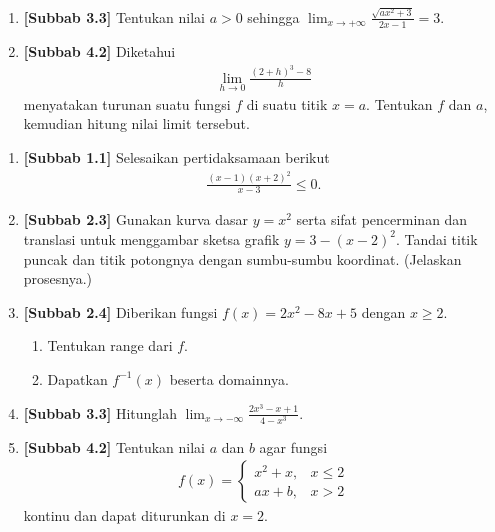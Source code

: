 \documentclass[10pt,openany,a4paper]{article}
\theoremstyle{definition}
\theoremstyle{definition}
\theoremstyle{plain}
\begin{document}
\begin{enumerate}
    \item \textbf{[Subbab 3.3]} Tentukan nilai $a>0$ sehingga $\displaystyle\lim_{x\to+\infty}\frac{\sqrt{ax^2+3}}{2x-1}=3$.

    \item \textbf{[Subbab 4.2]} Diketahui
    \begin{align*}
        \lim_{h\to 0}\frac{(2+h)^3-8}{h}
    \end{align*}
    menyatakan turunan suatu fungsi $f$ di suatu titik $x=a$. Tentukan $f$ dan $a$, kemudian hitung nilai limit tersebut.
\end{enumerate}

\newpage

\begin{enumerate}
    \item \textbf{[Subbab 1.1]} Selesaikan pertidaksamaan berikut
    \begin{align*}
        \frac{(x-1)(x+2)^2}{x-3}\leq 0.
    \end{align*}

    \item \textbf{[Subbab 2.3]} Gunakan kurva dasar $y=x^2$ serta sifat pencerminan dan translasi untuk menggambar sketsa grafik $y=3-(x-2)^2$. Tandai titik puncak dan titik potongnya dengan sumbu-sumbu koordinat. (Jelaskan prosesnya.)

    \item \textbf{[Subbab 2.4]} Diberikan fungsi $f(x)=2x^2-8x+5$ dengan $x\geq 2$.
    \begin{enumerate}
        \item Tentukan range dari $f$.
        \item Dapatkan $f^{-1}(x)$ beserta domainnya.
    \end{enumerate}

    \item \textbf{[Subbab 3.3]} Hitunglah $\displaystyle\lim_{x\to-\infty}\frac{2x^3-x+1}{4-x^3}$.

    \item \textbf{[Subbab 4.2]} Tentukan nilai $a$ dan $b$ agar fungsi
    \begin{align*}
        f(x)=\begin{cases}
            x^2+x, & x\leq 2\\
            ax+b, & x>2
        \end{cases}
    \end{align*}
    kontinu dan dapat diturunkan di $x=2$.
\end{enumerate}
\end{document}
